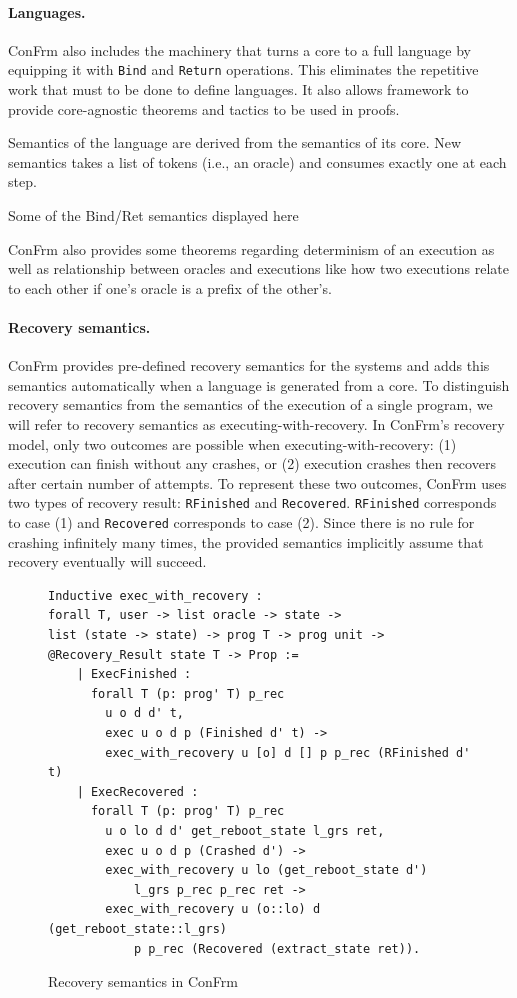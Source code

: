 \paragraph{Languages.}
ConFrm also includes the machinery that turns a core to a full language by equipping it with \texttt{Bind} and \texttt{Return} operations. This eliminates the repetitive work that must to be done to define languages. It also allows framework to provide core-agnostic theorems and tactics to be used in proofs.

Semantics of the language are derived from the semantics of its core. New  semantics takes a list of tokens (i.e., an oracle) and consumes exactly one at each step. 

{\color{red} Some of the Bind/Ret semantics displayed here}

ConFrm also provides some theorems regarding determinism of an execution as well as relationship between oracles and executions like how two executions relate to each other if one's oracle is a prefix of the other's.

\paragraph{Recovery semantics.}
ConFrm provides pre-defined recovery semantics for the systems and adds this semantics automatically when a language is generated from a core. To distinguish recovery semantics from the semantics of the execution of a single program, we will refer to recovery semantics as executing-with-recovery. In ConFrm's recovery model, only two outcomes are possible when executing-with-recovery: (1) execution can finish without any crashes, or (2) execution crashes then recovers after certain number of attempts. To represent these two outcomes, ConFrm uses two types of recovery result: \texttt{RFinished} and \texttt{Recovered}. \texttt{RFinished} corresponds to case (1) and \texttt{Recovered} corresponds to case (2). Since there is no rule for crashing infinitely many times, the provided semantics implicitly assume that recovery eventually will succeed. 

\begin{figure}[ht]
    \centering
    \begin{verbatim}
Inductive exec_with_recovery :
forall T, user -> list oracle -> state -> 
list (state -> state) -> prog T -> prog unit -> 
@Recovery_Result state T -> Prop :=
    | ExecFinished :
      forall T (p: prog' T) p_rec
        u o d d' t,
        exec u o d p (Finished d' t) ->
        exec_with_recovery u [o] d [] p p_rec (RFinished d' t)
    | ExecRecovered :
      forall T (p: prog' T) p_rec
        u o lo d d' get_reboot_state l_grs ret,
        exec u o d p (Crashed d') ->
        exec_with_recovery u lo (get_reboot_state d') 
            l_grs p_rec p_rec ret ->
        exec_with_recovery u (o::lo) d (get_reboot_state::l_grs) 
            p p_rec (Recovered (extract_state ret)).
    \end{verbatim}
    \caption{Recovery semantics in ConFrm}
    \label{fig:Recovery_Semantics}
\end{figure}


